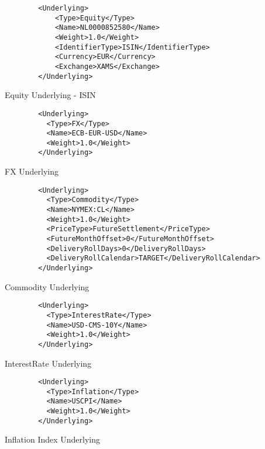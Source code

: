 \begin{listing}[H]
\begin{verbatim}
        <Underlying>
            <Type>Equity</Type>
            <Name>NL0000852580</Name>
            <Weight>1.0</Weight>
            <IdentifierType>ISIN</IdentifierType>
            <Currency>EUR</Currency>
            <Exchange>XAMS</Exchange>
        </Underlying>
\end{verbatim}
\caption{Equity Underlying - ISIN}
\label{lst:equnderlyingisin}
\end{listing}

\begin{listing}[H]
\begin{verbatim}
        <Underlying>
          <Type>FX</Type>
          <Name>ECB-EUR-USD</Name>
          <Weight>1.0</Weight>
        </Underlying>
\end{verbatim}
\caption{FX Underlying}
\label{lst:fxunderlying}
\end{listing}

\begin{listing}[H]
\begin{verbatim}
        <Underlying>
          <Type>Commodity</Type>
          <Name>NYMEX:CL</Name>
          <Weight>1.0</Weight>
          <PriceType>FutureSettlement</PriceType>
          <FutureMonthOffset>0</FutureMonthOffset>
          <DeliveryRollDays>0</DeliveryRollDays>
          <DeliveryRollCalendar>TARGET</DeliveryRollCalendar>
        </Underlying>
\end{verbatim}
\caption{Commodity Underlying}
\label{lst:communderlying}
\end{listing}

\begin{listing}[H]
\begin{verbatim}
        <Underlying>
          <Type>InterestRate</Type>
          <Name>USD-CMS-10Y</Name>
          <Weight>1.0</Weight>
        </Underlying>
\end{verbatim}
\caption{InterestRate Underlying}
\label{lst:irunderlying}
\end{listing}

\begin{listing}[H]
\begin{verbatim}
        <Underlying>
          <Type>Inflation</Type>
          <Name>USCPI</Name>
          <Weight>1.0</Weight>
        </Underlying>
\end{verbatim}
\caption{Inflation Index Underlying}
\label{lst:infunderlying}
\end{listing}

